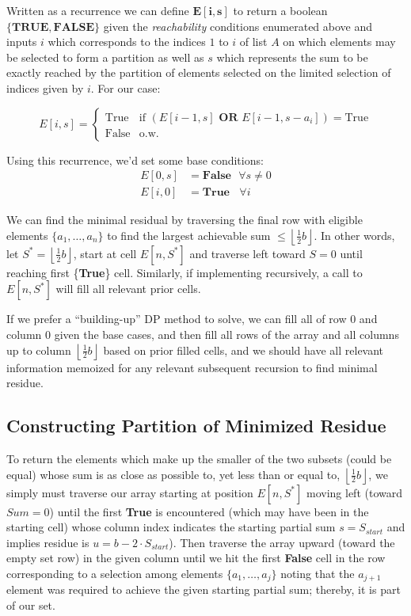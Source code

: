 \documentclass[conference]{styles/acmsiggraph}
\newcommand{\?}{\stackrel{?}{=}}
\DeclareRobustCommand{\mybox}[2][gray!20]{%
\begin{tcolorbox}[   %
        breakable,
        left=0pt,
        right=0pt,
        top=0pt,
        bottom=0pt,
        colback=#1,
        colframe=#1,
        width=\dimexpr\textwidth\relax, 
        enlarge left by=0mm,
        boxsep=5pt,
        arc=0pt,outer arc=0pt,
        ]
        #2
\end{tcolorbox}
}
\begin{document}
\mybox{
Written as a recurrence we can define $\mathbf{E[i,s]}$ to return a boolean $\mathbf{\{TRUE, FALSE \}}$ given the \textit{reachability} conditions enumerated above and inputs $i$ which corresponds to the indices $1$ to $i$ of list $A$ on which elements may be selected to form a partition as well as $s$ which represents the sum to be exactly reached by the partition of elements selected on the limited selection of indices given by $i$.  For our case:

\begin{equation*}
  E[i,s]=
  \begin{cases}
    \text{True} & \text{if } (E[i-1,s] \textbf{ OR } E[i-1,s - a_i]) = \text{True}\\
    \text{False} & \text{o.w.} 
  \end{cases}
\end{equation*}

Using this recurrence, we'd set some base conditions:
\begin{align*}
    E[0,s] &= \textbf{False}\ \ \ \forall s \neq 0\\
    E[i,0] &= \textbf{True}\ \ \ \ \forall i
\end{align*}

We can find the minimal residual by traversing the final row with eligible elements $\{a_1, \ldots, a_n\}$ to find the largest achievable sum $\leq \left \lfloor \frac{1}{2}b \right \rfloor$.  In other words, let $S^* = \left \lfloor \frac{1}{2}b \right \rfloor$, start at cell $E[n, S^*]$ and traverse left toward $S = 0$ until reaching first \{\textbf{True}\} cell.  Similarly, if implementing recursively, a call to $E[n, S^*]$ will fill all relevant prior cells.
}

If we prefer a \enquote{building-up} DP method to solve, we can fill all of row $0$ and column $0$ given the base cases, and then fill all rows of the array and all columns up to column $\left \lfloor \frac{1}{2}b \right \rfloor$ based on prior filled cells, and we should have all relevant information memoized for any relevant subsequent recursion to find minimal residue.

\subsection{Constructing Partition of Minimized Residue}
To return the elements which make up the smaller of the two subsets (could be equal) whose sum is as close as possible to, yet less than or equal to, $\left \lfloor \frac{1}{2}b \right \rfloor$, we simply must traverse our array starting at position $E[n, S^*]$ moving left (toward $Sum = 0$) until the first \textbf{True} is encountered (which may have been in the starting cell) whose column index indicates the starting partial sum $s = S_{start}$ and implies residue is $u = b-2\cdot S_{start}$).  Then traverse the array upward (toward the empty set row) in the given column until we hit the first \textbf{False} cell in the row corresponding to a selection among elements $\{a_1, \ldots, a_j\}$ noting that the $a_{j+1}$ element was required to achieve the given starting partial sum; thereby, it is part of our set.\\
\end{document}
